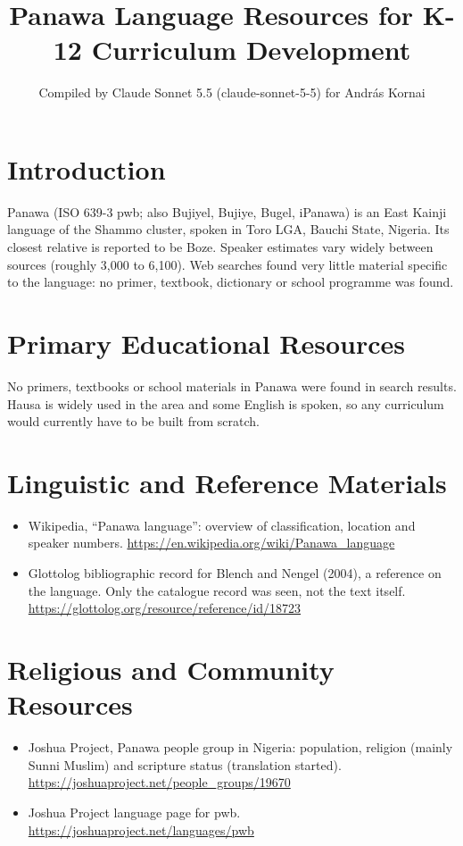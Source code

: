 \documentclass[12pt]{article}
\title{Panawa Language Resources for K-12 Curriculum Development}
\author{Compiled by Claude Sonnet 5.5 (claude-sonnet-5-5) for Andr\'as Kornai}
\date{}
\begin{document}
\maketitle

\section{Introduction}
Panawa (ISO 639-3 pwb; also Bujiyel, Bujiye, Bugel, iPanawa) is an East Kainji language of the Shammo cluster, spoken in Toro LGA, Bauchi State, Nigeria. Its closest relative is reported to be Boze. Speaker estimates vary widely between sources (roughly 3,000 to 6,100). Web searches found very little material specific to the language: no primer, textbook, dictionary or school programme was found.

\section{Primary Educational Resources}
No primers, textbooks or school materials in Panawa were found in search results. Hausa is widely used in the area and some English is spoken, so any curriculum would currently have to be built from scratch.

\section{Linguistic and Reference Materials}
\begin{itemize}
\item Wikipedia, ``Panawa language'': overview of classification, location and speaker numbers. \url{https://en.wikipedia.org/wiki/Panawa_language}
\item Glottolog bibliographic record for Blench and Nengel (2004), a reference on the language. Only the catalogue record was seen, not the text itself. \url{https://glottolog.org/resource/reference/id/18723}
\end{itemize}

\section{Religious and Community Resources}
\begin{itemize}
\item Joshua Project, Panawa people group in Nigeria: population, religion (mainly Sunni Muslim) and scripture status (translation started). \url{https://joshuaproject.net/people_groups/19670}
\item Joshua Project language page for pwb. \url{https://joshuaproject.net/languages/pwb}
\end{itemize}
\end{document}
